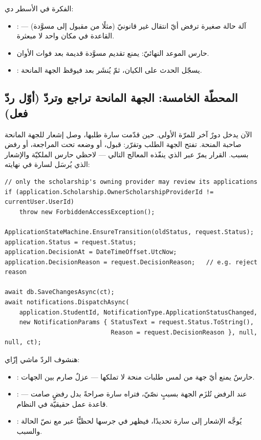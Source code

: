الفكرة في الأسطر دي:
\begin{itemize}
\item {}: آلة حالة صغيرة ترفض أيّ انتقال غير قانونيّ (مثلًا من
مقبول إلى مسوَّدة) — القاعدة في مكان واحد لا مبعثرة.
\item حارس الموعد النهائيّ: يمنع تقديم مسوَّدة قديمة بعد فوات الأوان.
\item {}: يسجّل الحدث على
الكيان، ثمّ يُنشَر بعد  فيوقظ الجهة المانحة.
\end{itemize}

\subsection{المحطّة الخامسة: الجهة المانحة تراجع وتردّ (أوّل ردّ فعل)}

الآن يدخل دورٌ آخر للمرّة الأولى. حين قدّمت سارة طلبها، وصل إشعار للجهة المانحة
صاحبة المنحة. تفتح الجهة الطلب وتقرّر: قبول، أو وضعه تحت المراجعة، أو رفض بسبب.
القرار يمرّ عبر  الذي ينفّذه المعالج التالي —
لاحظي حارس الملكيّة والإشعار الذي يُرسَل لسارة في نهايته:

\begin{english}
\begin{lstlisting}[language={[Sharp]C}]
// only the scholarship's owning provider may review its applications
if (application.Scholarship.OwnerScholarshipProviderId != currentUser.UserId)
    throw new ForbiddenAccessException();

ApplicationStateMachine.EnsureTransition(oldStatus, request.Status);
application.Status = request.Status;
application.DecisionAt = DateTimeOffset.UtcNow;
application.DecisionReason = request.DecisionReason;   // e.g. reject reason

await db.SaveChangesAsync(ct);
await notifications.DispatchAsync(
    application.StudentId, NotificationType.ApplicationStatusChanged,
    new NotificationParams { StatusText = request.Status.ToString(),
                             Reason = request.DecisionReason }, null, null, ct);
\end{lstlisting}
\end{english}

هنشوف الردّ ماشي إزّاي:
\begin{itemize}
\item {}: حارسٌ يمنع أيّ جهة من
لمس طلبات منحة لا تملكها — عزلٌ صارم بين الجهات.
\item {}: عند الرفض تُلزَم الجهة بسببٍ نصّيّ، فتراه سارة صراحةً بدل
رفضٍ صامت — قاعدة عمل حقيقيّة في النظام.
\item {}: يُوجَّه الإشعار
إلى سارة تحديدًا، فيظهر في جرسها لحظيًّا عبر  مع نصّ الحالة والسبب.
\end{itemize}

